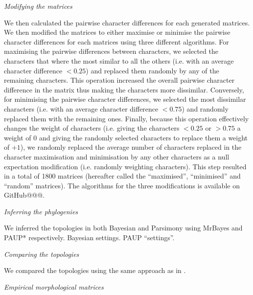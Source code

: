 \documentclass[12pt,letterpaper]{article}
\renewcommand{\subsection}[1]{%
\bigskip
\begin{center}
\begin{large}
\normalfont\itshape #1
\end{large}
\end{center}}
\begin{document}
\subsection{Modifying the matrices}

We then calculated the pairwise character differences for each generated matrices. 
We then modified the matrices to either maximise or minimise the pairwise character differences for each matrices using three different algorithms.
For maximising the pairwise differences between characters, we selected the characters that where the most similar to all the others (i.e. with an average character difference $<$$0.25$) and replaced them randomly by any of the remaining characters.
This operation increased the overall pairwise character difference in the matrix thus making the characters more dissimilar.
Conversely, for minimising the pairwise character differences, we selected the most dissimilar characters (i.e. with an average character difference $<$$0.75$) and randomly replaced them with the remaining ones.
Finally, because this operation effectively changes the weight of characters (i.e. giving the characters $<$$0.25$ or $>$$0.75$ a weight of $0$ and giving the randomly selected characters to replace them a weight of +$1$), we randomly replaced the average number of characters replaced in the character maximisation and minimisation by any other characters as a null expectation modification (i.e. randomly weighting characters).
This step resulted in a total of 1800 matrices (hereafter called the ``maximised'', ``minimised'' and ``random'' matrices).
The algorithms for the three modifications is available on GitHub@@@. %

\subsection{Inferring the phylogenies}

We inferred the topologies in both Bayesian and Parsimony using MrBayes and PAUP* respectively.
Bayesian settings.
PAUP ``settings''.

\subsection{Comparing the topologies}

We compared the topologies using the same approach as in \cite{Guillerme2016146}.

\subsection{Empirical morphological matrices}
\end{document}
